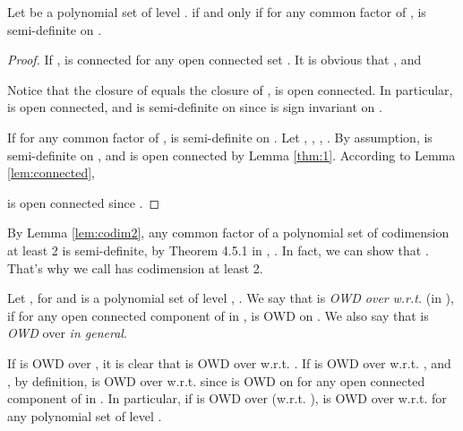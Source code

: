 \documentclass[amsthm]{elsart}
\begin{document}
\begin{lem}\label{lem:codim2}
Let  be a polynomial set of level .  if and only if for any common factor  of ,  is semi-definite on .
\end{lem}
\begin{proof}
  If ,  is connected for any open connected set . It is obvious that , and
  
  Notice that the closure of  equals the closure of ,  is open connected. In particular,  is open connected, and  is semi-definite on  since  is sign invariant on .

If for any common factor  of ,  is semi-definite on . Let , , , . By assumption,  is semi-definite on , and  is open connected by Lemma \ref{thm:1}. According to Lemma \ref{lem:connected},

is open connected since .
\end{proof}

By Lemma \ref{lem:codim2}, any common factor  of a polynomial set  of codimension at least 2 is semi-definite, by Theorem 4.5.1 in \citep{bochnak2013real}, . In fact, we can show that . That's why we call  has codimension at least 2.

\begin{defn}\label{def:generalweakopendeli}
Let ,  for  and  is a polynomial set of level , . We say that  is \emph{OWD over}  \emph{w.r.t.}  (in ), if for any open connected component  of  in ,  is OWD on . We also say that  is \emph{OWD} over  \emph{in general}.
\end{defn}\begin{rem}
If  is OWD over , it is clear that  is OWD over  w.r.t. . If  is OWD over  w.r.t. , and , by definition,  is OWD over  w.r.t.  since  is OWD on  for any open connected component  of  in . In particular, if  is OWD over  (w.r.t. ),  is OWD over  w.r.t.  for any polynomial set  of level .
\end{rem}
\end{document}
